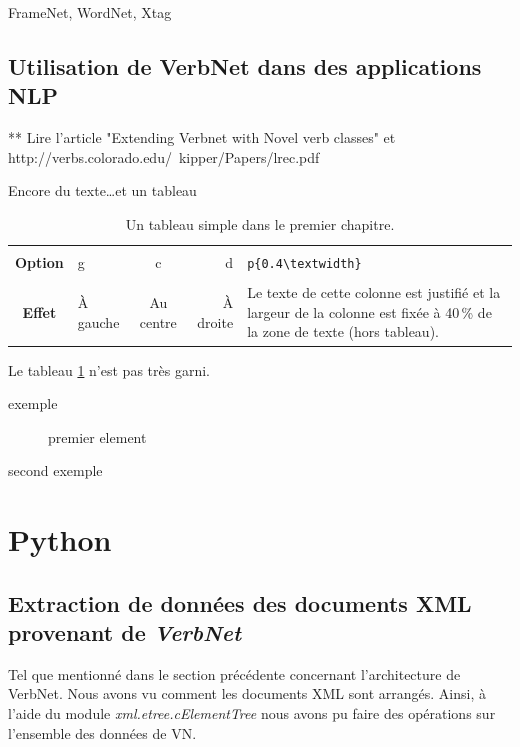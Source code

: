 \documentclass[12pt,maitrise,frenchb,natbib,twoside,initial]{dms}
\numberwithin{equation}{section}
\numberwithin{table}{chapter}
\numberwithin{figure}{chapter}
\begin{document}
FrameNet, WordNet, Xtag

\subsection {Utilisation de VerbNet dans des applications NLP}   

** Lire l'article "Extending Verbnet with Novel verb classes" et http://verbs.colorado.edu/~kipper/Papers/lrec.pdf


Encore du texte\dots et un tableau

\begin{table}[htb]
	\centering
	\caption{Un tableau simple dans le premier chapitre.}
	\label{tab:simple1}
	\begin{tabular}{|c||l|c|r|p{}|}
		\hline			&			&			&			&																															\\
		\textbf{Option}	& g			& c			& d			& \verb|p{0.4\textwidth}|																									\\[3mm]
		\hline\hline	&			&			&			&																															\\
		\textbf{Effet}	& À gauche	& Au centre	& À droite	& Le texte de cette colonne est justifié et la largeur de la colonne est fixée \`a 40\,\% de la zone de texte (hors tableau).	\\[3mm]
		\hline 
	\end{tabular}
\end{table}
Le tableau \ref{tab:simple1} n'est pas tr\`es garni.

\begin{description}
\item [exemple] premier element
\item [second exemple]
\end{description}

\section{Python}

\subsection{Extraction de données des documents XML provenant de \emph{VerbNet} }

Tel que mentionné dans le section précédente concernant l'architecture de VerbNet. Nous avons vu comment les documents XML sont  arrangés. Ainsi, à l'aide du module \emph{xml.etree.cElementTree} nous avons pu faire des opérations sur l'ensemble des données de VN.
\end{document}

